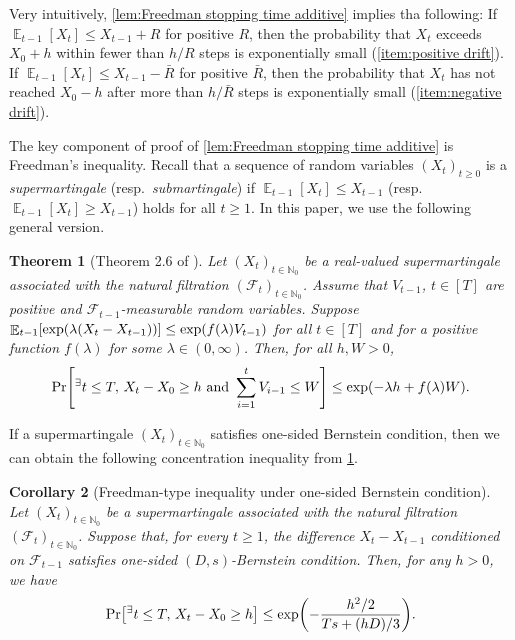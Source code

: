 \documentclass[letterpaper,11pt]{article}
\newtheorem{theorem}{Theorem}[section]
\newtheorem{corollary}[theorem]{Corollary}
\DeclarePairedDelimiter{\rbra}{\lparen}{\rparen} %
\DeclarePairedDelimiter{\sbra}{\lbrack}{\rbrack} %
\DeclareMathOperator*{\E}{\mathbb{E}}
\newcommand{\Nat}{\mathbb{N}}
\newcommand{\calF}{\mathcal{F}}
\newcommand{\bounded}{D}
\newcommand{\variance}{s}
\newcommand{\tinyexists}{{}^{\exists}}
\begin{document}
Very intuitively, \cref{lem:Freedman stopping time additive} implies tha following:
If $\E_{t-1}[X_t]\leq X_{t-1}+R$ for positive $R$, then the probability that $X_t$ exceeds $X_0+h$ within fewer than $h/R$ steps is exponentially small (\cref{item:positive drift}).
If $\E_{t-1}[X_t]\leq X_{t-1}-\bar{R}$ for positive $\bar{R}$, then the probability that $X_t$ has not reached $X_0-h$ after more than $h/\bar{R}$ steps is exponentially small (\cref{item:negative drift}).

The key component of proof of \cref{lem:Freedman stopping time additive} is Freedman's inequality.
Recall that a sequence of random variables $(X_t)_{t\ge 0}$ is a \emph{supermartingale} (resp.\ \emph{submartingale}) if $\E_{t-1}[X_t]\leq X_{t-1}$ (resp.\ $\E_{t-1}[X_t]\geq X_{t-1}$) holds for all $t\ge 1$.
  In this paper, we use the following general version.
  \begin{theorem}[Theorem 2.6 of \cite{FGL15}]
    \label{thm:general Freedman}
        Let $(X_t)_{t\in \Nat_0}$ be a real-valued supermartingale associated with the natural filtration $(\mathcal{F}_t)_{t\in \Nat_0}$.
        Assume that $V_{t-1}$, $t\in [T]$ are positive and $\mathcal{F}_{t-1}$-measurable random variables.
        Suppose 
        $
        \E_{t-1}\sbra*{\exp\rbra*{\lambda (X_t-X_{t-1})}}\leq \exp\rbra*{f(\lambda)V_{t-1}}
        $
        for all $t\in [T]$ and for a positive function $f(\lambda)$ for some $\lambda\in (0,\infty)$.
        Then, for all $h, W>0$,
        \begin{align*}
            \Pr\sbra*{\tinyexists t \le T,\,X_t-X_0\geq h \textrm{ and }\sum_{i=1}^tV_{i-1}\leq W} \leq \exp\rbra*{-\lambda h+f(\lambda)W }.
        \end{align*}
  \end{theorem}
  If a supermartingale $(X_t)_{t\in \Nat_0}$ satisfies one-sided Bernstein condition, then we can obtain the following concentration inequality from \cref{thm:general Freedman}.
    \begin{corollary}[Freedman-type inequality under one-sided Bernstein condition] 
      \label{cor:Freedman}
        Let $(X_t)_{t\in \Nat_0}$ be a supermartingale associated with the natural filtration $(\calF_t)_{t\in \Nat_0}$.
        Suppose that, for every $t\ge 1$, the difference $X_t - X_{t-1}$ conditioned on $\calF_{t-1}$ satisfies one-sided $(\bounded,\variance)$-Bernstein condition.
        Then, for any $h > 0$, we have
      \begin{align*}
         \Pr\sbra*{{}^{\exists} t\le T,\,X_t-X_0\geq h} \leq \exp\rbra*{-\frac{h^2/2}{T\variance + (h\bounded )/3}}.
      \end{align*}
    \end{corollary}
\end{document}
